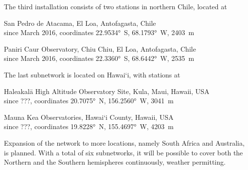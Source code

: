         The third installation consists of two stations in northern Chile, located at
        \begin{description}[leftmargin = 25mm]
            \item[SP]       San Pedro de Atacama, El Loa, Antofagasta, Chile\\
                            since March 2016, coordinates \ang{22.9534}~S, \ang{68.1793}~W, \SI{2403}{\metre}
            \item[PC]       Paniri Caur Observatory, Chiu Chiu, El Loa, Antofagasta, Chile\\
                            since March 2016, coordinates \ang{22.3360}~S, \ang{68.6442}~W, \SI{2535}{\metre}
        \end{description}

        The last subnetwork is located on Hawai`i, with stations at
        \begin{description}[leftmargin = 25mm]
            \item[HK]       Haleakalā High Altitude Observatory Site, Kula, Maui, Hawaii, USA\\
                            since ???, coordinates \ang{20.7075}~N, \ang{156.2560}~W, \SI{3041}{\metre} 
            \item[MK]       Mauna Kea Observatories, Hawai`i County, Hawaii, USA\\
                            since ???, coordinates \ang{19.8228}~N, \ang{155.4697}~W, \SI{4203}{\metre} 
        \end{description}


        Expansion of the network to more locations, namely South Africa and Australia, is planned.
        With a total of six subnetworks, it will be possible to cover both the Northern and
        the Southern hemispheres continuously, weather permitting.
